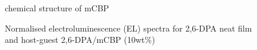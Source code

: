 \documentclass[
  letterpaper,
  DIV=11,
  numbers=noendperiod,
  oneside]{scrreprt}
\begin{document}
\begin{figure}
\begin{minipage}[b]{0.60\linewidth}
{{}

\caption{\label{fig-mcbp}chemical structure of mCBP}

}

\end{minipage}%
\newline
\begin{minipage}[b]{\linewidth}

{\centering 


\caption{\label{fig-dpasepc}Normalised electroluminescence (EL) spectra
for 2,6-DPA neat film and host-guest 2,6-DPA/mCBP (10wt\%)}

}

\end{minipage}%
\newline
\begin{minipage}[b]{\linewidth}

{\centering 

}
\end{minipage}
\end{figure}
\end{document}
